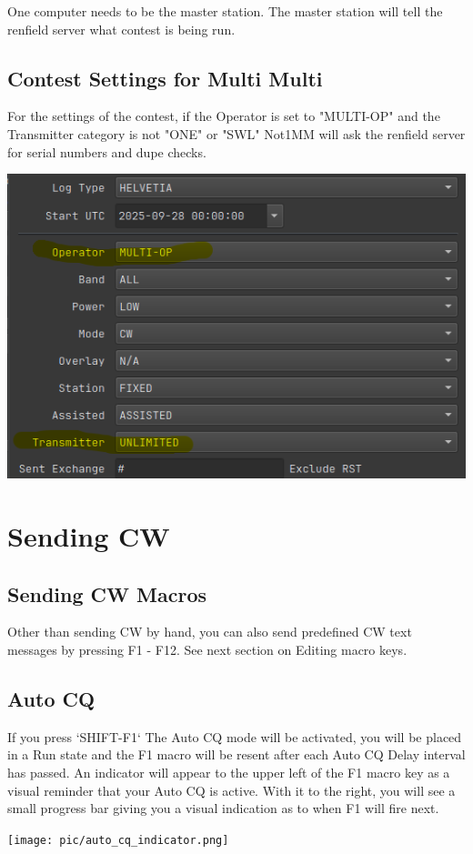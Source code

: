 \documentclass{article}
\begin{document}
One computer needs to be the master station. The master station will tell the renfield server what contest is being run.

\subsection{Contest Settings for Multi Multi}
For the settings of the contest, if the Operator is set to "MULTI-OP" and the Transmitter category is not "ONE" or "SWL" Not1MM will ask the renfield server for serial numbers and dupe checks.

\vspace{0.5cm}
\begin{center}
\includegraphics[width=0.5\linewidth]{pic/multi_multi.png}
\end{center}
\vspace{0.5cm}

\newpage
\section{Sending CW}
\subsection{Sending CW Macros}
Other than sending CW by hand, you can also send predefined CW text messages by pressing F1 - F12. See next section on Editing macro keys.
\subsection{Auto CQ}
If you press `SHIFT-F1` The Auto CQ mode will be activated, you will be placed in a Run state and the F1 macro will be resent after each Auto CQ Delay interval has passed. An indicator will appear to the upper left of the F1 macro key as a visual reminder that your Auto CQ is active. With it to the right, you will see a small progress bar giving you a visual indication as to when F1 will fire next.

\vspace{0.5cm}
\begin{center}
\texttt{[image: pic/auto\_cq\_indicator.png]}
\end{center}
\vspace{0.5cm}
\end{document}
